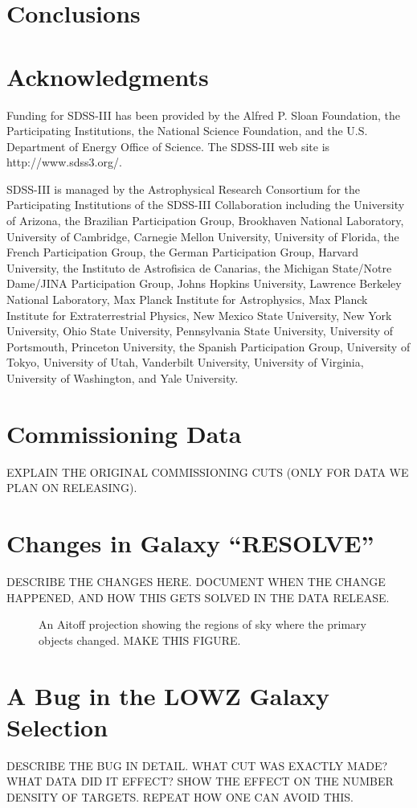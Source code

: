 \documentclass[preprint]{aastex}
\begin{document}
\section{Conclusions}


\section{Acknowledgments}

Funding for SDSS-III has been provided by the Alfred P. Sloan
Foundation, the Participating Institutions, the National Science
Foundation, and the U.S. Department of Energy Office of Science. The
SDSS-III web site is http://www.sdss3.org/.

SDSS-III is managed by the Astrophysical Research Consortium for the
Participating Institutions of the SDSS-III Collaboration including the
University of Arizona,
the Brazilian Participation Group,
Brookhaven National Laboratory,
University of Cambridge,
Carnegie Mellon University,
University of Florida,
the French Participation Group,
the German Participation Group,
Harvard University,
the Instituto de Astrofisica de Canarias,
the Michigan State/Notre Dame/JINA Participation Group,
Johns Hopkins University,
Lawrence Berkeley National Laboratory,
Max Planck Institute for Astrophysics,
Max Planck Institute for Extraterrestrial Physics,
New Mexico State University,
New York University,
Ohio State University,
Pennsylvania State University,
University of Portsmouth,
Princeton University,
the Spanish Participation Group,
University of Tokyo,
University of Utah,
Vanderbilt University,
University of Virginia,
University of Washington,
and Yale University.

\appendix

\section{Commissioning Data}
\label{app:comm}

EXPLAIN THE ORIGINAL COMMISSIONING CUTS (ONLY FOR DATA WE PLAN ON RELEASING). 


\section{Changes in Galaxy ``RESOLVE''}
\label{app:resolve}

DESCRIBE THE CHANGES HERE. DOCUMENT WHEN THE CHANGE HAPPENED, AND HOW THIS 
GETS SOLVED IN THE DATA RELEASE.

\begin{figure}
\caption{An Aitoff projection showing the regions of sky where the primary
objects changed. MAKE THIS FIGURE.}
\end{figure}

\section{A Bug in the LOWZ Galaxy Selection}
\label{app:lowzbug}

DESCRIBE THE BUG IN DETAIL. WHAT CUT WAS EXACTLY MADE? WHAT DATA DID IT EFFECT?
SHOW THE EFFECT ON THE NUMBER DENSITY OF TARGETS. REPEAT HOW ONE CAN AVOID THIS.
\end{document}
